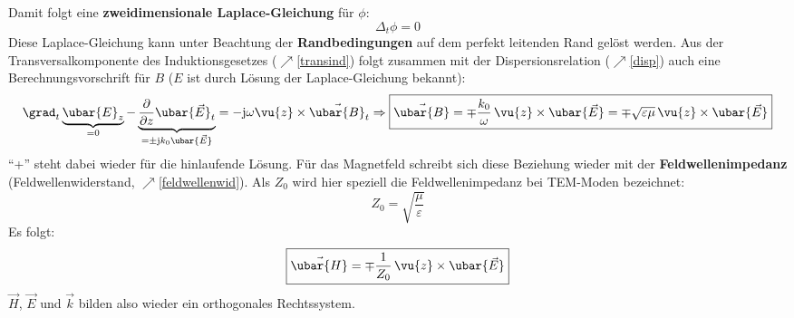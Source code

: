 	 Damit folgt eine \textbf{zweidimensionale Laplace-Gleichung} für \(\phi\):
	\begin{equation}
		\boxed{\Delta _t \phi  = 0} 
	\end{equation}
Diese Laplace-Gleichung kann unter Beachtung der \textbf{Randbedingungen} auf dem perfekt leitenden Rand gelöst werden. Aus der Transversalkomponente des Induktionsgesetzes ($\nearrow$\ref{transind}) folgt zusammen mit der Dispersionsrelation ($\nearrow$\ref{disp}) auch eine Berechnungsvorschrift für $B$ ($E$ ist durch Lösung der Laplace-Gleichung bekannt):
	\begin{equation}
		\grad _t \underbrace{\ubar{E}_{z}}_{=0} - \underbrace{\frac{\partial}{\partial z}\ubar{\vec{E}}_t}_{=\pm\mathrm{j} k_0 \ubar{\vec{E}}}
		= -\mathrm{j}\omega \vu{z} \times \vec{\ubar{B}}_t
		\Rightarrow
		\boxed{\vec{\ubar{B}} = \mp \frac{ k_0}{\omega}\, \vu{z}\times\ubar{\vec{E}} = \mp \sqrt{\varepsilon\mu}\, \vu{z}\times\ubar{\vec{E}}} 
	\end{equation}
	\enquote{+} steht dabei wieder für die hinlaufende Lösung. Für das Magnetfeld schreibt sich diese Beziehung wieder mit der \textbf{Feldwellenimpedanz} (Feldwellenwiderstand, $\nearrow$\ref{feldwellenwid}). Als $Z_0$ wird hier speziell die Feldwellenimpedanz bei TEM-Moden bezeichnet:
	\begin{equation}
		\boxed{Z_0=\sqrt{\frac{\mu}{\varepsilon}}}
	\end{equation}
	Es folgt:
	\begin{equation}
		\boxed{\vec{\ubar{H}} = \mp \frac{1}{Z_0}\, \vu{z}\times\ubar{\vec{E}}} 
	\end{equation}
	$\vec{H}$, $\vec{E}$ und $\vec{k}$ bilden also wieder ein orthogonales Rechtssystem.
